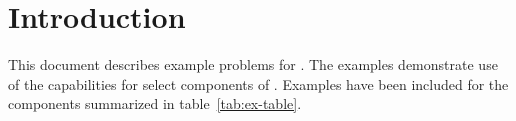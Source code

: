 \section*{Introduction}

This document describes example problems for \mf. The examples demonstrate use of the capabilities for select components of \mf. Examples have been included for the \mf components summarized in table~\ref{tab:ex-table}.


